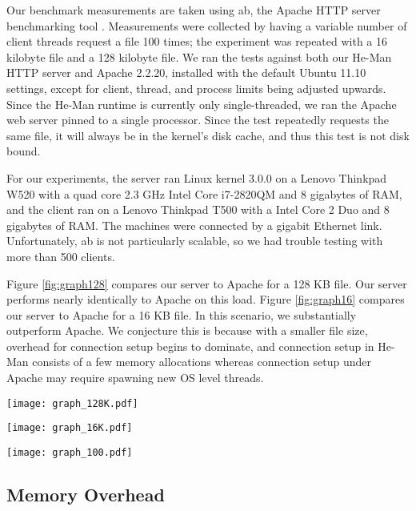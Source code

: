 \documentclass[preprint]{sigplanconf}
\begin{document}
Our benchmark measurements are taken using ab, the Apache HTTP server
benchmarking tool \cite{ApacheAB}. Measurements were collected by
having a variable number of client threads request a file 100 times;
the experiment was repeated with a 16 kilobyte file and a 128 kilobyte
file. We ran the tests against both our He-Man HTTP server and Apache
2.2.20, installed with the default Ubuntu 11.10 settings, except for
client, thread, and process limits being adjusted upwards. Since the
He-Man runtime is currently only single-threaded, we ran the Apache
web server pinned to a single processor. Since the test repeatedly
requests the same file, it will always be in the kernel's disk cache,
and thus this test is not disk bound.

For our experiments, the server ran Linux kernel 3.0.0 on a Lenovo
Thinkpad W520 with a quad core 2.3 GHz Intel Core i7-2820QM and 8
gigabytes of RAM, and the client ran on a Lenovo Thinkpad T500 with a
Intel Core 2 Duo and 8 gigabytes of RAM.  %
The machines were connected by a gigabit Ethernet link.
Unfortunately, ab is not particularly scalable, so we had trouble
testing with more than 500 clients.

Figure \ref{fig:graph128} compares our server to Apache for a 128 KB
file. Our server performs nearly identically to Apache on this load.
Figure \ref{fig:graph16} compares our server to Apache for a 16 KB
file. In this scenario, we substantially outperform Apache. We
conjecture this is because with a smaller file size, overhead for
connection setup begins to dominate, and connection setup in He-Man
consists of a few memory allocations whereas connection setup under
Apache may require spawning new OS level threads.

\begin{figure*}[!ht]
\centering
\texttt{[image: graph\_128K.pdf]}
\caption{Web server benchmark, 128 KB file.}
\label{fig:graph128}
\end{figure*}
\begin{figure*}[!ht]
\centering
\texttt{[image: graph\_16K.pdf]}
\caption{Web server benchmark, 16 KB file.}
\label{fig:graph16}
\end{figure*}
\begin{figure*}[!ht]
\centering
\texttt{[image: graph\_100.pdf]}
\caption{Web server benchmark, 100 B file.}
\label{fig:graph100}
\end{figure*}

\subsection{Memory Overhead}
\end{document}
